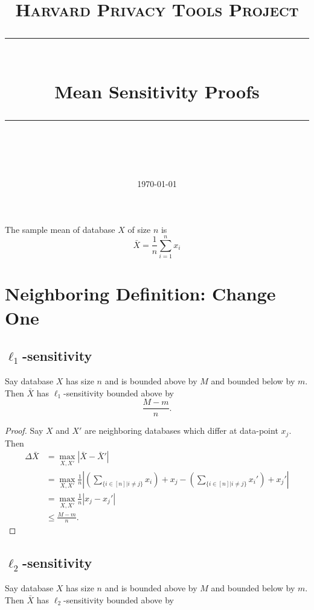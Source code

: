 \documentclass[11pt]{scrartcl} %
\title{
	\normalfont\normalsize
	\textsc{Harvard Privacy Tools Project}\\ %
	\vspace{25pt} %
	\rule{\linewidth}{0.5pt}\\ %
	\vspace{20pt} %
	{\huge Mean Sensitivity Proofs}\\ %
	\vspace{12pt} %
	\rule{\linewidth}{2pt}\\ %
	\vspace{12pt} %
}
\date{\normalsize\today} %
\begin{document}
\maketitle

\begin{definition}
The sample mean of database $X$ of size $n$ is
$$\bar{X} = \frac{1}{n} \sum_{i=1}^n x_i $$
\end{definition}

\section{Neighboring Definition: Change One}

\subsection{$\ell_1$-sensitivity}
\begin{theorem}
Say database $X$ has size $n$ and is bounded above by $M$ and bounded below by $m$. Then $\bar{X}$ has $\ell_1$-sensitivity bounded above by
$$ \frac{M-m}{n}.$$
\end{theorem}

\begin{proof}
Say $X$ and $X'$ are neighboring databases which differ at data-point $x_j$. Then
\begin{align*}
\Delta{\bar{X}} &= \max_{X,X'} \left\vert \bar{X} - \bar{X}' \right\vert \\
	&=  \max_{X,X'} \frac{1}{n} \left\vert \left(\sum_{\{ i \in [n] \vert i \ne j\}} x_i\right) + x_j  - \left(\sum_{\{ i \in [n] \vert i \ne j\}} x_i'\right) + x_j'  \right\vert \\
	&= \max_{X,X'} \frac{1}{n} \left\vert x_j - x_j' \right\vert \\
	&\le \frac{M-m}{n}.
\end{align*}
\end{proof}

\subsection{$\ell_2$-sensitivity}
\begin{theorem}
	Say database $X$ has size $n$ and is bounded above by $M$ and bounded below by $m$.
	Then $\bar{X}$ has $\ell_2$-sensitivity bounded above by
\end{theorem}
\end{document}
